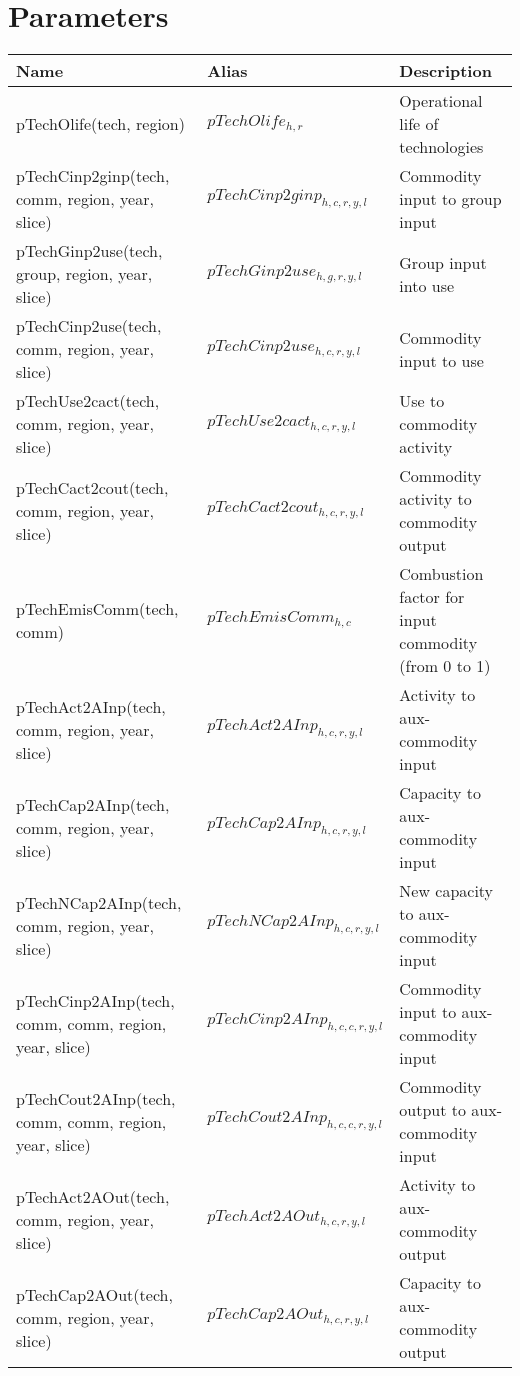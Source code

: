 \documentclass{article}
\begin{document}
\section*{Parameters}
\begin{longtable}{|p{10cm}|p{5cm}|p{9cm}|}
\hline
\bf{Name} & \bf{Alias}  & \bf{Description} \\ 
 \hline
pTechOlife(tech, region) & $pTechOlife_{h,r}$ & Operational life of technologies \\ 
 \hline
pTechCinp2ginp(tech, comm, region, year, slice) & $pTechCinp2ginp_{h,c,r,y,l}$ & Commodity input to group input \\ 
 \hline
pTechGinp2use(tech, group, region, year, slice) & $pTechGinp2use_{h,g,r,y,l}$ & Group input into use \\ 
 \hline
pTechCinp2use(tech, comm, region, year, slice) & $pTechCinp2use_{h,c,r,y,l}$ & Commodity input to use \\ 
 \hline
pTechUse2cact(tech, comm, region, year, slice) & $pTechUse2cact_{h,c,r,y,l}$ & Use to commodity activity \\ 
 \hline
pTechCact2cout(tech, comm, region, year, slice) & $pTechCact2cout_{h,c,r,y,l}$ & Commodity activity to commodity output \\ 
 \hline
pTechEmisComm(tech, comm) & $pTechEmisComm_{h,c}$ & Combustion factor for input commodity (from 0 to 1) \\ 
 \hline
pTechAct2AInp(tech, comm, region, year, slice) & $pTechAct2AInp_{h,c,r,y,l}$ & Activity to aux-commodity input \\ 
 \hline
pTechCap2AInp(tech, comm, region, year, slice) & $pTechCap2AInp_{h,c,r,y,l}$ & Capacity to aux-commodity input \\ 
 \hline
pTechNCap2AInp(tech, comm, region, year, slice) & $pTechNCap2AInp_{h,c,r,y,l}$ & New capacity to aux-commodity input \\ 
 \hline
pTechCinp2AInp(tech, comm, comm, region, year, slice) & $pTechCinp2AInp_{h,c,c,r,y,l}$ & Commodity input to aux-commodity input \\ 
 \hline
pTechCout2AInp(tech, comm, comm, region, year, slice) & $pTechCout2AInp_{h,c,c,r,y,l}$ & Commodity output to aux-commodity input \\ 
 \hline
pTechAct2AOut(tech, comm, region, year, slice) & $pTechAct2AOut_{h,c,r,y,l}$ & Activity to aux-commodity output \\ 
 \hline
pTechCap2AOut(tech, comm, region, year, slice) & $pTechCap2AOut_{h,c,r,y,l}$ & Capacity to aux-commodity output \\ 

\end{longtable}
\end{document}
